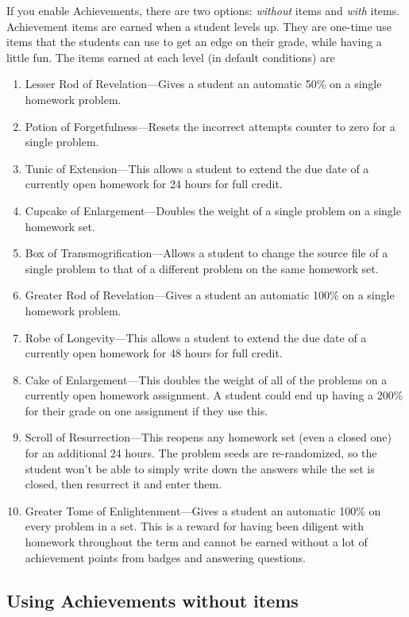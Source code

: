 \documentclass[12pt]{article}
\begin{document}
If you enable Achievements, there are two options: \emph{without} items and \emph{with} items.
Achievement items are earned when a student levels up.
They are one-time use  items that the students can use to get an edge on their grade, while having a little fun.
The items earned at each level (in default conditions) are \begin{enumerate}
	\item Lesser Rod of Revelation---Gives a student an automatic 50\% on a single homework problem.
	\item Potion of Forgetfulness---Resets the incorrect attempts counter to zero for a single problem.
	\item Tunic of Extension---This allows a student to extend the due date of a currently open homework for 24 hours for full credit.
	\item Cupcake of Enlargement---Doubles the weight of a single problem on a single homework set.
	\item Box of Transmogrification---Allows a student to change the source file of a single problem to that of a different problem on the same homework set.
	\item Greater Rod of Revelation---Gives a student an automatic 100\% on a single homework problem.
	\item Robe of Longevity---This allows a student to extend the due date of a currently open homework for 48 hours for full credit.
	\item Cake of Enlargement---This doubles the weight of all of the problems on a currently open homework assignment.
	      A student could end up having a 200\% for their grade on one assignment if they use this.
	\item Scroll of Resurrection---This reopens any homework set (even a closed one) for an additional 24 hours.
	      The problem seeds are re-randomized, so the student won't be able to simply write down the answers while the set is closed, then resurrect it and enter them.
	\item Greater Tome of Enlightenment---Gives a student an automatic 100\% on every problem in a set.
	      This is a reward for having been diligent with homework throughout the term and cannot be earned without a lot of achievement points from badges and answering questions.
\end{enumerate}

\subsection{Using Achievements without items}
\end{document}
